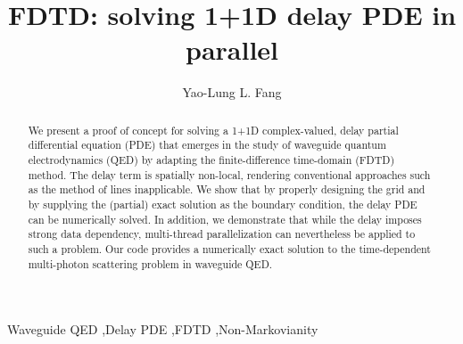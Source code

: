 \documentclass[final,1p,times]{elsarticle}
\begin{document}
\begin{frontmatter}



\title{FDTD: solving 1+1D delay PDE in parallel}


\author[e,g,h]{Yao-Lung L. Fang}


\address[e]{Department of Physics, Duke University, P.O.\ Box 90305, Durham, North Carolina 27708-0305, USA}
\address[g]{Computational Science Initiative, Brookhaven National Laboratory, Upton, NY 11973-5000, USA\footnotemark[1]}
\address[h]{National Synchrotron Light Source II, Brookhaven National Laboratory, Upton, NY 11973-5000, USA\footnotemark[1]}

\begin{abstract}
We present a proof of concept for solving a 1+1D complex-valued, delay partial differential equation (PDE) that emerges in the study of waveguide quantum electrodynamics (QED) by adapting the finite-difference time-domain (FDTD) method. The delay term is spatially non-local, rendering conventional approaches such as the method of lines inapplicable. 
We show that by properly designing the grid and by supplying the (partial) exact solution as the boundary condition, the delay PDE can be numerically solved. In addition, we demonstrate that while the delay imposes strong data dependency, multi-thread parallelization can nevertheless be applied to such a problem. Our code provides a numerically exact solution to the time-dependent multi-photon scattering problem in waveguide QED. 
\end{abstract}

\begin{keyword}
Waveguide QED \sep Delay PDE \sep FDTD \sep Non-Markovianity
\end{keyword}

\end{frontmatter}
\end{document}
